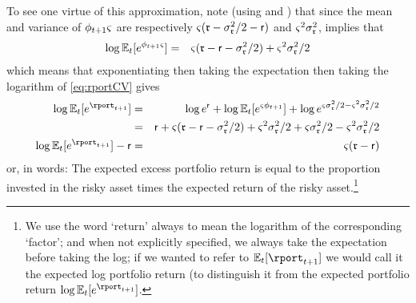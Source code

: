 To see one virtue of this approximation, note (using  and ) that since the mean and variance of $\phi_{t+1} {\varsigma}$ are respectively ${\varsigma}(\mathfrak{r} - \sigma^{2}_{\mathfrak{r}}/2- \mathsf{r})$ and ${\varsigma}^{2} \sigma^{2}_{\mathfrak{r}}$,  implies that
\begin{eqnarray}
 \log \mathbb{E}_{t}[e^{\phi_{t+1} {\varsigma}}] & = & {\varsigma} (\mathfrak{r} - \mathsf{r} - \sigma^{2}_{\mathfrak{r}}/2) + {\varsigma}^{2}\sigma^{2}_{\mathfrak{r}}/2
\end{eqnarray}
which means that exponentiating then taking the expectation then taking the logarithm of \eqref{eq:rportCV} gives
\begin{eqnarray}
   \log \Ex_{t}[e^{\rport_{t+1}}] & = & \log e^{\rfree} + \log \Ex_{t}[e^{\riskyshare \eprem_{t+1}}] + \log e^{\riskyshare\sigma^{2}_{\risky}/2 - \riskyshare^{2}\sigma^{2}_{\risky}/2}
\\ & = &
\rfree + \riskyshare (\risky-\rfree-\sigma^{2}_{\risky}/2)+\riskyshare^{2}\sigma^{2}_{\risky}/2 +\riskyshare \sigma^{2}_{\risky}/2 - \riskyshare^{2}\sigma^{2}_{\risky}/2
\\ \log \Ex_{t}[e^{\rport_{t+1}}] - \rfree & = &  \riskyshare (\risky-\rfree) \label{eq:rportDist}
\end{eqnarray}
or, in words: The expected excess portfolio return is equal to the proportion invested in the risky asset times the expected return of the risky asset.\footnote{We use the word `return' always to mean the logarithm of the corresponding `factor'; and when not explicitly specified, we always take the expectation before taking the log; if we wanted to refer to $\Ex_{t}[\rport_{t+1}]$ we would call it the expected log portfolio return (to distinguish it from the expected portfolio return $\log \Ex_{t}[e^{\rport_{t+1}}]$.}

